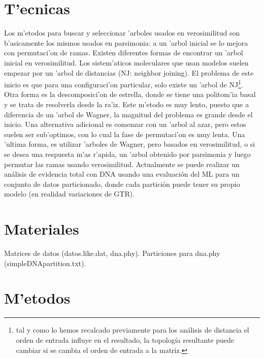 \section{T'ecnicas}
Los m'etodos para buscar y seleccionar 'arboles usados en verosimilitud son b'asicamente los mismos usados en parsimonia: a un 'arbol inicial se lo mejora con permutaci'on de ramas. Existen diferentes formas de encontrar un 'arbol inicial en verosimilitud. Los sistem'aticos moleculares que usan modelos suelen empezar por un 'arbol de distancias (NJ: neighbor joining). El problema de este inicio es que para una configuraci'on particular, solo existe un 'arbol de NJ\footnote{tal y como lo hemos recalcado previamente para los an\'alisis de distancia el orden de entrada influye en el resultado, la topolog\'ia resultante puede cambiar si se cambia el orden de entrada a la matriz.}. Otra forma es la descomposici'on de estrella, donde se tiene una politom'ia basal y se trata de resolverla desde la ra'iz. Este m'etodo es muy lento, puesto que a diferencia de un 'arbol de Wagner, la magnitud del problema es grande desde el inicio. Una alternativa adicional es comenzar con un 'arbol al azar, pero estos suelen ser sub'optimos, con lo cual la fase de permutaci'on es muy lenta. Una 'ultima forma, es utilizar 'arboles de Wagner, pero basados en verosimilitud, o si se desea una respuesta m'as r'apida, un 'arbol obtenido por parsimonia y luego permutar las ramas usando verosimilitud.
Actualmente se puede realizar un an\'alisis de evidencia total con DNA 
usando una evaluaci\'on del ML para un conjunto de datos particionado, donde cada partici\'on puede tener su propio modelo (en realidad variaciones de GTR).

\section{Materiales}
\noindent
Matrices de datos (datos.like.dat, dna.phy).
Particiones para dna.phy (simpleDNApartition.txt).
\section{M'etodos}
